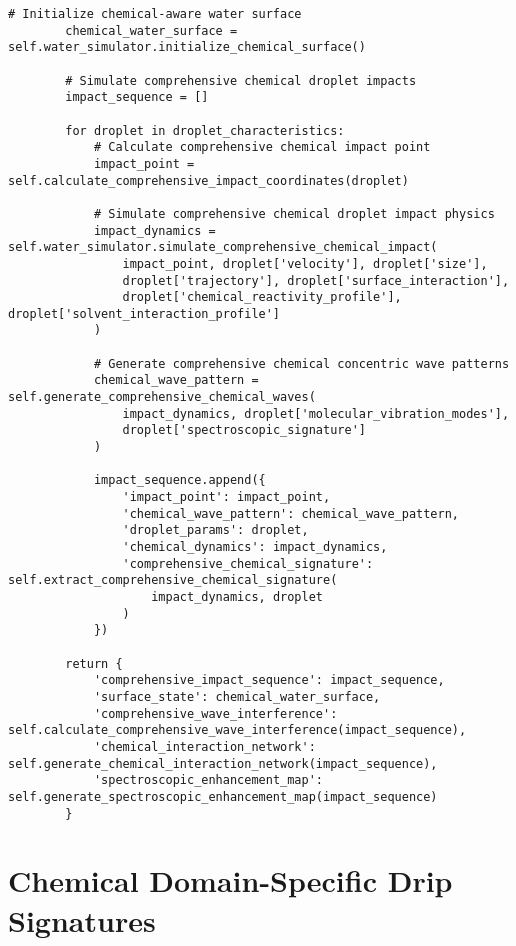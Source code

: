 \documentclass[12pt,a4paper]{article}
\begin{document}
\begin{algorithm}
\begin{algorithmic}[1]
\begin{lstlisting}[style=pythonstyle, caption=Core Molecule-to-Drip Implementation for Comprehensive Chemical Analysis]
        # Initialize chemical-aware water surface
        chemical_water_surface = self.water_simulator.initialize_chemical_surface()
        
        # Simulate comprehensive chemical droplet impacts
        impact_sequence = []
        
        for droplet in droplet_characteristics:
            # Calculate comprehensive chemical impact point
            impact_point = self.calculate_comprehensive_impact_coordinates(droplet)
            
            # Simulate comprehensive chemical droplet impact physics
            impact_dynamics = self.water_simulator.simulate_comprehensive_chemical_impact(
                impact_point, droplet['velocity'], droplet['size'],
                droplet['trajectory'], droplet['surface_interaction'],
                droplet['chemical_reactivity_profile'], droplet['solvent_interaction_profile']
            )
            
            # Generate comprehensive chemical concentric wave patterns
            chemical_wave_pattern = self.generate_comprehensive_chemical_waves(
                impact_dynamics, droplet['molecular_vibration_modes'],
                droplet['spectroscopic_signature']
            )
            
            impact_sequence.append({
                'impact_point': impact_point,
                'chemical_wave_pattern': chemical_wave_pattern,
                'droplet_params': droplet,
                'chemical_dynamics': impact_dynamics,
                'comprehensive_chemical_signature': self.extract_comprehensive_chemical_signature(
                    impact_dynamics, droplet
                )
            })
        
        return {
            'comprehensive_impact_sequence': impact_sequence,
            'surface_state': chemical_water_surface,
            'comprehensive_wave_interference': self.calculate_comprehensive_wave_interference(impact_sequence),
            'chemical_interaction_network': self.generate_chemical_interaction_network(impact_sequence),
            'spectroscopic_enhancement_map': self.generate_spectroscopic_enhancement_map(impact_sequence)
        }
\end{lstlisting}

\section{Chemical Domain-Specific Drip Signatures}


\end{algorithmic}
\end{algorithm}
\end{document}
